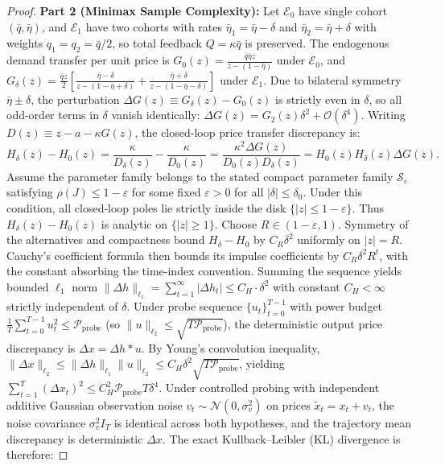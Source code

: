 \documentclass[12pt]{article}
\theoremstyle{definition}
\theoremstyle{remark}
\begin{document}
\begin{proof}
\textbf{Part 2 (Minimax Sample Complexity):} Let $\mathcal{E}_0$ have single cohort $(\bar{q}, \bar{\eta})$, and $\mathcal{E}_1$ have two cohorts with rates $\bar{\eta}_1 = \bar{\eta} - \delta$ and $\bar{\eta}_2 = \bar{\eta} + \delta$ with weights $q_1 = q_2 = \bar{q}/2$, so total feedback $Q = \kappa \bar{q}$ is preserved.
The endogenous demand transfer per unit price is $G_0(z) = \frac{\bar{q} \bar{\eta} z}{z - (1 - \bar{\eta})}$ under $\mathcal{E}_0$, and $G_\delta(z) = \frac{\bar{q} z}{2} [ \frac{\bar{\eta}-\delta}{z - (1 - \bar{\eta} + \delta)} + \frac{\bar{\eta}+\delta}{z - (1 - \bar{\eta} - \delta)} ]$ under $\mathcal{E}_1$. Due to bilateral symmetry $\bar{\eta} \pm \delta$, the perturbation $\Delta G(z) \equiv G_\delta(z) - G_0(z)$ is strictly even in $\delta$, so all odd-order terms in $\delta$ vanish identically: $\Delta G(z) = G_2(z) \delta^2 + \mathcal{O}(\delta^4)$.
Writing $D(z) \equiv z - a - \kappa G(z)$, the closed-loop price transfer discrepancy is:
\begin{equation}
H_\delta(z) - H_0(z) = \frac{\kappa}{D_\delta(z)} - \frac{\kappa}{D_0(z)} = \frac{\kappa^2 \Delta G(z)}{D_0(z) D_\delta(z)} = H_0(z) H_\delta(z) \Delta G(z).
\end{equation}
Assume the parameter family belongs to the stated compact parameter family $\mathcal S_\varepsilon$ satisfying $\rho(J)\le1-\varepsilon$ for some fixed $\varepsilon > 0$ for all $|\delta| \le \delta_0$. Under this condition, all closed-loop poles lie strictly inside the disk $\{|z| \le 1 - \varepsilon\}$. Thus $H_\delta(z) - H_0(z)$ is analytic on $\{|z|\ge1\}$. Choose $R\in(1-\varepsilon,1)$. Symmetry of the alternatives and compactness bound $H_\delta-H_0$ by $C_R\delta^2$ uniformly on $|z|=R$. Cauchy's coefficient formula then bounds its impulse coefficients by $C_R\delta^2R^t$, with the constant absorbing the time-index convention. Summing the sequence yields bounded $\ell_1$ norm $\|\Delta h\|_{\ell_1} = \sum_{t=1}^\infty |\Delta h_t| \le C_H \cdot \delta^2$ with constant $C_H < \infty$ strictly independent of $\delta$. Under probe sequence $\{u_t\}_{t=0}^{T-1}$ with power budget $\frac{1}{T} \sum_{t=0}^{T-1} u_t^2 \le \mathcal{P}_{\text{probe}}$ (so $\|u\|_{\ell_2} \le \sqrt{T \mathcal{P}_{\text{probe}}}$), the deterministic output price discrepancy is $\Delta x = \Delta h * u$.
By Young's convolution inequality, $\|\Delta x\|_{\ell_2} \le \|\Delta h\|_{\ell_1} \|u\|_{\ell_2} \le C_H \delta^2 \sqrt{T \mathcal{P}_{\text{probe}}}$, yielding $\sum_{t=1}^T (\Delta x_t)^2 \le C_H^2 \mathcal{P}_{\text{probe}} T \delta^4$.
Under controlled probing with independent additive Gaussian observation noise $v_t \sim \mathcal{N}(0, \sigma_v^2)$ on prices $\tilde{x}_t = x_t + v_t$, the noise covariance $\sigma_v^2 I_T$ is identical across both hypotheses, and the trajectory mean discrepancy is deterministic $\Delta x$. The exact Kullback--Leibler (KL) divergence is therefore:

\end{proof}
\end{document}
